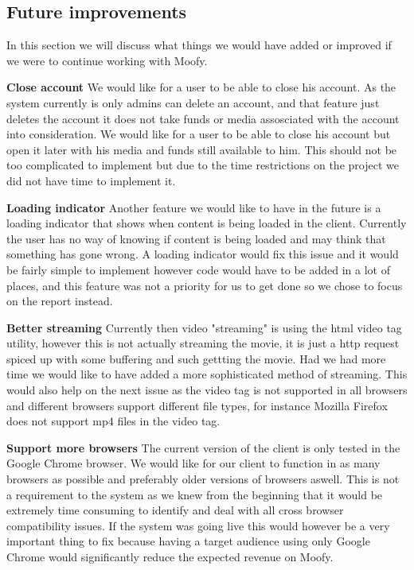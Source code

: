 \subsection{Future improvements}
\label{sec:futureimps}
In this section we will discuss what things we would have added or improved if we were to continue working with Moofy.

\textbf{Close account } We would like for a user to be able to close his account. As the system currently is only admins can delete an account,
and that feature just deletes the account it does not take funds or media assosciated with the account into consideration. We would like for a
user to be able to close his account but open it later with his media and funds still available to him. This should not be too complicated to 
implement but due to the time restrictions on the project we did not have time to implement it.

\textbf{Loading indicator } Another feature we would like to have in the future is a loading indicator that shows when content is being loaded in the client. 
Currently the user has no way of knowing if content is being loaded and may think that something has  gone wrong. A loading indicator would fix this issue 
and it would be fairly simple to implement however code would have to be added in a lot of places, and this feature was not a priority for us to get done so
we chose to focus on the report instead.

\textbf{Better streaming} Currently then video "streaming" is using the html video tag utility, however this is not actually streaming the movie, it is just
a http request spiced up with some buffering and such gettting the movie. Had we had more time we would like to have added a more sophisticated method
of streaming. This would also help on the next issue as the video tag is not supported in all browsers and different browsers support different file types, for
instance Mozilla Firefox does not support mp4 files in the video tag.

\textbf{Support more browsers} The current version of the client is only tested in the Google Chrome browser. We would like for our client to function in as 
many browsers as possible and preferably older versions of browsers aswell. This is not a requirement to the system as we knew from the beginning that it 
would be extremely time consuming to identify and deal with all cross browser compatibility issues. If the system was going live this would however be a very
important thing to fix because having a target audience using only Google Chrome would significantly reduce the expected revenue on Moofy.